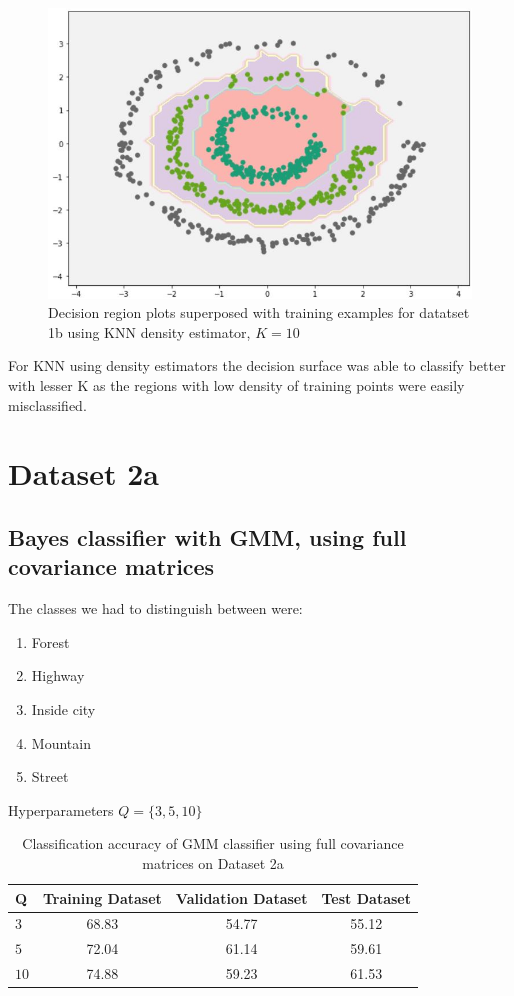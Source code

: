 \documentclass[11pt]{article}
\begin{document}
\begin{figure}[h]
\centering
\includegraphics[scale=0.35]{dataset1b_k10_knn_density.jpg}	
\caption{Decision region plots superposed with training examples for datatset 1b using KNN density estimator, $K=10$}
\label{fig:fig2.1.1}
\end{figure}

For KNN using density estimators the decision surface was able to classify better with lesser K as the regions with low density of training points were easily misclassified.
\newpage

\section{Dataset 2a}
\subsection{Bayes classifier with GMM, using full covariance matrices}

The classes we had to distinguish between were:
\begin{enumerate}
\item Forest
\item Highway
\item Inside city
\item Mountain
\item Street
\end{enumerate}

Hyperparameters $Q = \{3,5,10\}$
\begin{table}[h!]
\label{tab:tab1.1.1}
\begin{center}
\begin{tabular}{|l|c|c|c|}
\hline
\textbf{Q } & \textbf{Training Dataset} & \textbf{Validation Dataset} &\textbf{Test Dataset}\\
\hline
$3$ & 68.83 & 54.77 & 55.12\\
\hline
$5$ & 72.04 & 61.14 & 59.61\\
\hline
$10$ & 74.88 & 59.23 & 61.53\\
\hline
\end{tabular}
\caption{Classification accuracy of GMM classifier using full covariance matrices on Dataset 2a}
\end{center}
\end{table}
\end{document}
